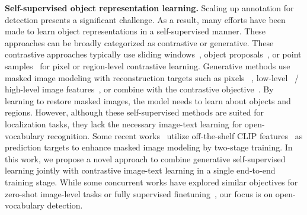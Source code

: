 \documentclass[10pt,twocolumn,letterpaper]{article}
\renewcommand{\paragraph}[1]{\vspace{1mm}\noindent\textbf{#1}}
\begin{document}
\paragraph{Self-supervised object representation learning.}\quad
Scaling up annotation for detection presents a significant challenge. As a result, many efforts have been made to learn object representations in a self-supervised manner. These approaches can be broadly categorized as contrastive or generative. 
These contrastive approaches typically use sliding windows~\cite{Xiao_2021_ICCV}, object proposals~\cite{SoCo,Henaff_2021_ICCV}, or point samples~\cite{Bai_2022_CVPR} for pixel or region-level contrastive learning. Generative methods use masked image modeling with reconstruction targets such as pixels ~\cite{He_2022_CVPR}, low-level~\cite{bao2021beit,wei2022masked} / high-level image features~\cite{chen2022sdae,zhou2021ibot}, or combine with the contrastive objective~\cite{huang2022contrastive}. By learning to restore masked images, the model needs to learn about objects and regions. However, although these self-supervised methods are suited for localization tasks, they lack the necessary image-text learning for open-vocabulary recognition. Some recent works~\cite{wei2022mvp,peng2022beit,zhang2022cae,hou2022milan,fang2022eva} utilize off-the-shelf CLIP features~\cite{radford2021clip} as prediction targets to enhance masked image modeling by two-stage training. In this work, we propose a novel approach to combine generative self-supervised learning jointly with contrastive image-text learning in a single end-to-end training stage. While some concurrent works have explored similar objectives for zero-shot image-level tasks or fully supervised finetuning~\cite{dong2022maskclip,yang2023masked,su2022towards}, our focus is on open-vocabulary detection.
\end{document}
